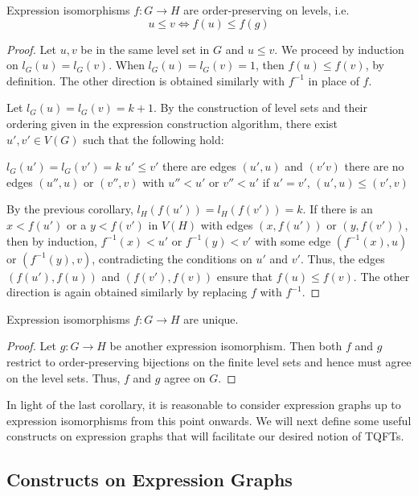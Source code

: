 \documentclass[./Thick_TQFTs_and_Quantum_Information.tex]{subfiles}
\begin{document}
\begin{lem}
Expression isomorphisms $f : G \to H$ are order-preserving on levels, i.e.
\[
  u \leq v \iff f(u) \leq f(g)
\]
\end{lem}
\begin{proof}
Let $u, v$ be in the same level set in $G$ and $u \leq v$. We proceed by
induction on $l_G(u) = l_G(v)$. When $l_G(u) = l_G(v) = 1$, then
$f(u) \leq f(v)$, by definition. The other direction is obtained similarly with
$f^{-1}$ in place of $f$.

Let $l_G(u) = l_G(v) = k + 1$. By the construction of level sets and their
ordering given in the expression construction algorithm, there exist
$u', v' \in V(G)$ such that the following hold:
\begin{enmrt}
\li $l_G(u') = l_G(v') = k$
\li $u' \leq v'$
\li there are edges $(u', u)$ and $(v' v)$
\li there are no edges $(u'', u)$ or $(v'', v)$ with $u'' < u'$ or $v'' < u'$
\li if $u' = v'$, $(u', u) \leq (v', v)$
\end{enmrt}
By the previous corollary, $l_H(f(u')) = l_H(f(v')) = k$.
If there is an $x < f(u')$ or a $y < f(v')$ in $V(H)$ with edges
$(x, f(u'))$ or $(y, f(v'))$, then by induction, $f^{-1}(x) < u'$ or
$f^{-1}(y) < v'$ with some edge $(f^{-1}(x), u)$ or $(f^{-1}(y), v)$,
contradicting the conditions on $u'$ and $v'$. Thus, the edges $(f(u'), f(u))$
and $(f(v'), f(v))$ ensure that $f(u) \leq f(v)$. The other direction is again
obtained similarly by replacing $f$ with $f^{-1}$.
\end{proof}

\begin{cor}\label{cor:expiso_unique}
Expression isomorphisms $f : G \to H$ are unique.
\end{cor}
\begin{proof}
Let $g : G \to H$ be another expression isomorphism. Then both $f$ and $g$
restrict to order-preserving bijections on the finite level sets and hence must
agree on the level sets. Thus, $f$ and $g$ agree on $G$.
\end{proof}

In light of the last corollary, it is reasonable to consider expression graphs
up to expression isomorphisms from this point onwards. We will next define some
useful constructs on expression graphs that will facilitate our desired notion
of TQFTs.

\subsection{Constructs on Expression Graphs}
\end{document}
